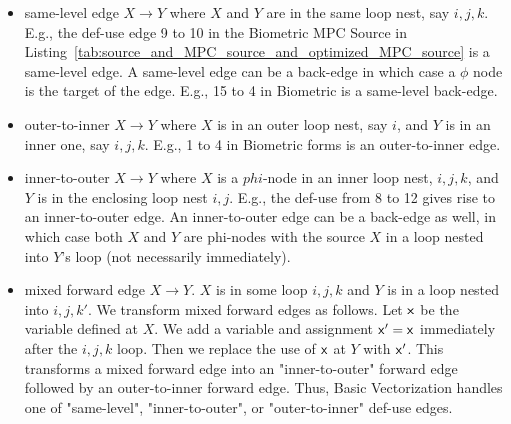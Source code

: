 \documentclass[sigconf, screen, natbib=false, dvipsnames, table]{acmart}
\theoremstyle{definition}
\begin{document}
\begin{itemize}
\item same-level edge $X\rightarrow Y$ where $X$ and $Y$ are in the same loop nest, say $i,j,k$. E.g., the def-use edge 9 to 10 in the Biometric MPC Source in Listing~\ref{tab:source_and_MPC_source_and_optimized_MPC_source} is a same-level edge. A same-level edge can be a back-edge in which case a $\phi$ node is the target of the edge. 
E.g., 15 to 4 in Biometric is a same-level back-edge.
\item outer-to-inner $X\rightarrow Y$ where $X$ is in an outer loop nest, say $i$, and $Y$ is in an inner one, say $i,j,k$. E.g., 1 to 4 in Biometric forms is an outer-to-inner edge.
\item inner-to-outer $X\rightarrow Y$ where $X$ is a $phi$-node in an inner loop nest, $i,j,k$, and $Y$ is in the enclosing loop nest $i,j$. E.g., the def-use from 8 to 12 gives rise to an inner-to-outer edge.
An inner-to-outer edge can be a back-edge as well, in which case both $X$ and $Y$ are phi-nodes with the source $X$ in a loop nested into $Y$'s loop (not necessarily immediately).


\item mixed forward edge $X\rightarrow Y$. $X$ is in some loop $i,j,k$ and $Y$ is in a loop nested into $i,j,k'$. We transform mixed forward edges as follows. Let ${\sf {x}}$ be the variable defined at $X$. We add a variable and assignment ${\sf {x}}' = {\sf {x}}$ immediately after the $i,j,k$ loop. Then we replace the use of ${\sf {x}}$ at $Y$ with ${\sf {x}}'$. This transforms a mixed forward edge into an "inner-to-outer" forward edge followed by an outer-to-inner forward edge. Thus, Basic Vectorization handles one of "same-level", "inner-to-outer", or "outer-to-inner" def-use edges.
 \end{itemize}
\end{document}
